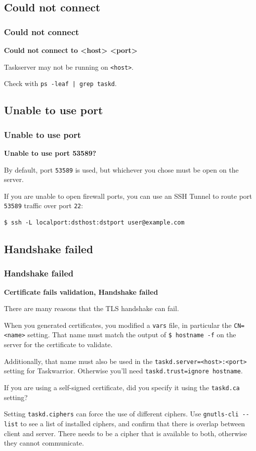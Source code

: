 \documentclass[t,handout]{beamer}
\begin{document}
\subsection{Could not connect}

\begin{frame}[fragile]\frametitle{Could not connect}
    \vfill
    \textbf{Could not connect to <host> <port>}

    Taskserver may not be running on \verb+<host>+.

    Check with \verb+ps -leaf | grep taskd+.
\end{frame}

\subsection{Unable to use port}

\begin{frame}[fragile]\frametitle{Unable to use port}
    \vfill
    \textbf{Unable to use port 53589?}

    By default, port \verb+53589+ is used, but whichever you chose must be open on the server.

    If you are unable to open firewall ports, you can use an SSH Tunnel to route port \verb+53589+ traffic over port \verb+22+:

    \begin{lstlisting}
$ ssh -L localport:dsthost:dstport user@example.com\end{lstlisting}
\end{frame}

\subsection{Handshake failed}

\begin{frame}[fragile]\frametitle{Handshake failed}
    \vfill
    \textbf{Certificate fails validation, Handshake failed}

    There are many reasons that the TLS handshake can fail.

    When you generated certificates, you modified a \verb+vars+ file, in particular the \verb+CN=<name>+ setting. That name must match the output of  \verb+$ hostname -f+ on the server for the certificate to validate.

    Additionally, that name must also be used in the \verb+taskd.server=<host>:<port>+ setting for Taskwarrior. Otherwise you'll need \verb+taskd.trust=ignore hostname+.

    If you are using a self-signed certificate, did you specify it using the \verb+taskd.ca+ setting?

    Setting \verb+taskd.ciphers+ can force the use of different ciphers. Use \verb+gnutls-cli --list+ to see a list of installed ciphers, and confirm that there is overlap between client and server. There needs to be a cipher that is available to both, otherwise they cannot communicate.
\end{frame}
\end{document}
